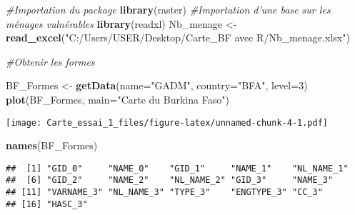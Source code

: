 \documentclass[]{article}
\newenvironment{Shaded}{\begin{snugshade}}{\end{snugshade}}
\newcommand{\CommentTok}[1]{\textcolor[rgb]{0.56,0.35,0.01}{\textit{#1}}}
\newcommand{\DataTypeTok}[1]{\textcolor[rgb]{0.13,0.29,0.53}{#1}}
\newcommand{\DecValTok}[1]{\textcolor[rgb]{0.00,0.00,0.81}{#1}}
\newcommand{\KeywordTok}[1]{\textcolor[rgb]{0.13,0.29,0.53}{\textbf{#1}}}
\newcommand{\NormalTok}[1]{#1}
\newcommand{\StringTok}[1]{\textcolor[rgb]{0.31,0.60,0.02}{#1}}
\begin{document}
\begin{Shaded}
\begin{Highlighting}[]
\CommentTok{#Importation du package}
\KeywordTok{library}\NormalTok{(raster)}
\CommentTok{#Importation d'une base sur les ménages vulnérables}
\KeywordTok{library}\NormalTok{(readxl)}
\NormalTok{Nb_menage <-}\StringTok{ }\KeywordTok{read_excel}\NormalTok{(}\StringTok{"C:/Users/USER/Desktop/Carte_BF avec R/Nb_menage.xlsx"}\NormalTok{)}


\CommentTok{#Obtenir les formes}

\NormalTok{BF_Formes <-}\StringTok{ }\KeywordTok{getData}\NormalTok{(}\DataTypeTok{name=}\StringTok{"GADM"}\NormalTok{, }\DataTypeTok{country=}\StringTok{"BFA"}\NormalTok{, }\DataTypeTok{level=}\DecValTok{3}\NormalTok{)}
\KeywordTok{plot}\NormalTok{(BF_Formes, }\DataTypeTok{main=}\StringTok{"Carte du Burkina Faso"}\NormalTok{)}
\end{Highlighting}
\end{Shaded}

\texttt{[image: Carte\_essai\_1\_files/figure-latex/unnamed-chunk-4-1.pdf]}

\begin{Shaded}
\begin{Highlighting}[]
\KeywordTok{names}\NormalTok{(BF_Formes)}
\end{Highlighting}
\end{Shaded}

\begin{verbatim}
##  [1] "GID_0"     "NAME_0"    "GID_1"     "NAME_1"    "NL_NAME_1"
##  [6] "GID_2"     "NAME_2"    "NL_NAME_2" "GID_3"     "NAME_3"   
## [11] "VARNAME_3" "NL_NAME_3" "TYPE_3"    "ENGTYPE_3" "CC_3"     
## [16] "HASC_3"
\end{verbatim}
\end{document}
